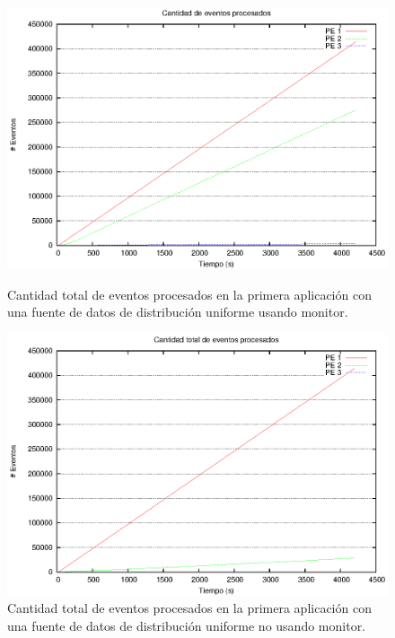 \begin{figure}[ht]
\centering

\begin{minipage}[c]{0.45\textwidth}
\centering
    \includegraphics[width=\textwidth]{images/exp/app2/uniform/cm/eventCount.eps}
    \caption{Cantidad total de eventos procesados en la primera aplicación con una fuente de datos de distribución uniforme usando monitor.}
    \label{fig:app2-uniform-eventCount-cm}
\end{minipage} \hspace*{1cm}
\begin{minipage}[c]{0.45\textwidth}
\centering
    \includegraphics[width=\textwidth]{images/exp/app2/uniform/sm/eventCount.eps}
    \caption{Cantidad total de eventos procesados en la primera aplicación con una fuente de datos de distribución uniforme no usando monitor.}
    \label{fig:app2-uniform-eventCount-sm}
\end{minipage}

\end{figure}

